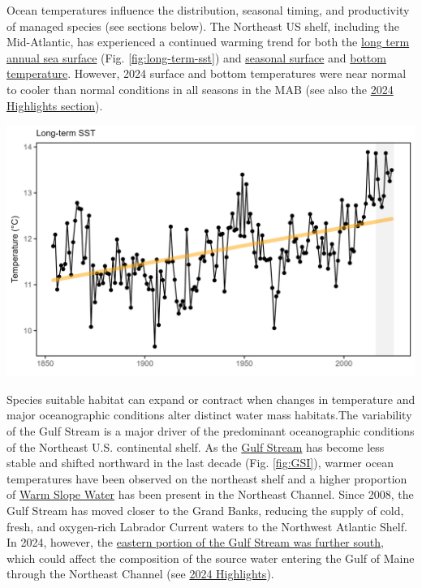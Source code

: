 \documentclass[
  10pt,
]{article}
\let\origfigure\figure
\let\endorigfigure\endfigure
\renewenvironment{figure}[1][2] {
    \expandafter\origfigure\expandafter[H]
} {
    \endorigfigure
}
\begin{document}
Ocean temperatures influence the distribution, seasonal timing, and productivity of managed species (see sections below). The Northeast US shelf, including the Mid-Atlantic, has experienced a continued warming trend for both the \href{https://noaa-edab.github.io/catalog/long_term_sst.html}{long term annual sea surface} (Fig. \ref{fig:long-term-sst}) and \href{https://noaa-edab.github.io/catalog/seasonal_oisst_anom.html}{seasonal surface} and \href{https://noaa-edab.github.io/catalog/bottom_temp_model_anom.html}{bottom temperature}. However, 2024 surface and bottom temperatures were near normal to cooler than normal conditions in all seasons in the MAB (see also the \hyperref[highlights]{2024 Highlights section}).

\begin{figure}

{\centering \includegraphics[width=6.5in]{images/BothReports/long_term_sst_BothReports_2025-09-09} 

}

\caption{Northeast US annual sea surface temperature (SST, black), with increasing trend (orange).}\label{fig:long-term-sst}
\end{figure}

Species suitable habitat can expand or contract when changes in temperature and major oceanographic conditions alter distinct water mass habitats.The variability of the Gulf Stream is a major driver of the predominant oceanographic conditions of the Northeast U.S. continental shelf. As the \href{https://noaa-edab.github.io/catalog/gsi.html}{Gulf Stream} has become less stable and shifted northward in the last decade (Fig. \ref{fig:GSI}), warmer ocean temperatures have been observed on the northeast shelf and a higher proportion of \href{https://noaa-edab.github.io/catalog/slopewater.html}{Warm Slope Water} has been present in the Northeast Channel. Since 2008, the Gulf Stream has moved closer to the Grand Banks, reducing the supply of cold, fresh, and oxygen-rich Labrador Current waters to the Northwest Atlantic Shelf. In 2024, however, the \href{https://noaa-edab.github.io/catalog/gsi.html}{eastern portion of the Gulf Stream was further south}, which could affect the composition of the source water entering the Gulf of Maine through the Northeast Channel (see \hyperref[highlights]{2024 Highlights}).
\end{document}
